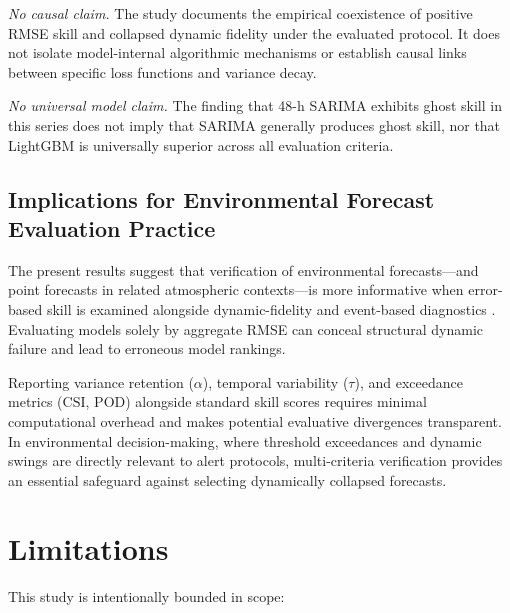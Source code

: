 \documentclass[12pt]{article}
\begin{document}
\emph{No causal claim.}
The study documents the empirical coexistence of positive RMSE skill and collapsed dynamic fidelity under the evaluated protocol. It does not isolate model-internal algorithmic mechanisms or establish causal links between specific loss functions and variance decay.

\emph{No universal model claim.}
The finding that 48-h SARIMA exhibits ghost skill in this series does not imply that SARIMA generally produces ghost skill, nor that LightGBM is universally superior across all evaluation criteria.

\subsection{Implications for Environmental Forecast Evaluation Practice}
\label{sec:disc_implications}

The present results suggest that verification of environmental forecasts---and point forecasts in related atmospheric contexts---is more informative when error-based skill is examined alongside dynamic-fidelity and event-based diagnostics \citep{gneiting2011,jolliffe2012,bonas2025}. Evaluating models solely by aggregate RMSE can conceal structural dynamic failure and lead to erroneous model rankings.

Reporting variance retention ($\alpha$), temporal variability ($\tau$), and exceedance metrics ($\mathrm{CSI}$, $\mathrm{POD}$) alongside standard skill scores requires minimal computational overhead and makes potential evaluative divergences transparent. In environmental decision-making, where threshold exceedances and dynamic swings are directly relevant to alert protocols, multi-criteria verification provides an essential safeguard against selecting dynamically collapsed forecasts.

\section{Limitations}
\label{sec:limitations}

This study is intentionally bounded in scope:
\end{document}
